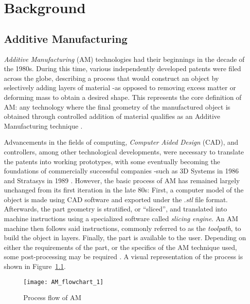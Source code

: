 \documentclass[main.tex]{subfiles}
\begin{document}
\chapter{Background} \label{ch:bg}
\section{Additive Manufacturing}\label{sec:AM} %
\emph{Additive Manufacturing} (AM) technologies had their beginnings in the decade of the 1980s. During this time, various independently developed patents were filed across the globe, describing a process that would construct an object by selectively adding layers of material -as opposed to removing excess matter or deforming mass to obtain a desired shape. This represents the core definition of AM: any technology where the final geometry of the manufactured object is obtained through controlled addition of material qualifies as an Additive Manufacturing technique \cite{Gibson2015}.

Advancements in the fields of computing, \emph{Computer Aided Design} (CAD), and controllers, among other technological developments, were necessary to translate the patents into working prototypes, with some eventually becoming the foundations of commercially successful companies -such as 3D Systems in 1986 and Stratasys in 1989 \cite{Gibson2015,3DSystems,Stratasys2017}. However, the basic process of AM has remained largely unchanged from its first iteration in the late 80s: First, a computer model of the object is made using CAD software and exported under the .\emph{stl} file format. Afterwards, the part geometry is stratified, or \textquotedblleft sliced\textquotedblright, and translated into machine instructions using a specialized software called \emph{slicing engine}. An AM machine then follows said instructions, commonly referred to as the \emph{toolpath}, to build the object in layers. Finally, the part is available to the user. Depending on either the requirements of the part, or the specifics of the AM technique used, some post-processing may be required \cite{Gibson2015}. A visual representation of the process is shown in Figure~\ref{fig:AM_flow}.

\begin{figure}[h]
	\center
	\texttt{[image: AM\_flowchart\_1]}
	\caption{Process flow of AM} \label{fig:AM_flow}
\end{figure}
\pagebreak %
 
\end{document}
